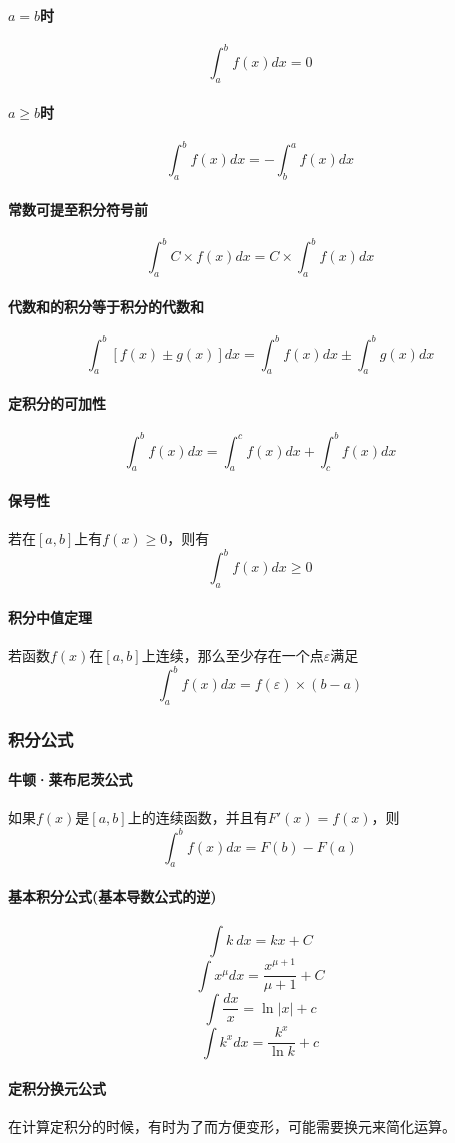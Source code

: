 \documentclass[UTF-8]{ctexart}
\begin{document}
	\paragraph{$a=b$时} $$\int _ a^b f(x)dx=0$$
	\paragraph{$a \ge b$时} $$\int _ a^b f(x)dx=-\int _ b^a f(x)dx$$
	\paragraph{常数可提至积分符号前}$$\int _ a^b C \times f(x)dx=C \times \int _ a^b f(x)dx$$
	\paragraph{代数和的积分等于积分的代数和}$$\int _ a^b [f(x)\pm g(x)]dx=\int _ a^b f(x)dx\pm\int _ a^b g(x)dx$$
	\paragraph{定积分的可加性}
	$$\int _ a^b f(x)dx=\int _ a^c f(x)dx+\int _ c^b f(x)dx$$
	\paragraph{保号性}
	若在$[a,b]$上有$f(x) \ge 0$，则有$$\int _ a^b f(x)dx \ge 0$$
	\paragraph{积分中值定理}若函数$f(x)$在$[a,b]$上连续，那么至少存在一个点$\varepsilon$满足$$\int _ a^b f(x)dx=f(\varepsilon) \times (b-a)$$
	\subsubsection{积分公式}
	\paragraph{牛顿·莱布尼茨公式}如果$f(x)$是$[a,b]$上的连续函数，并且有$F'(x)=f(x)$，则$$\int _ a^b f(x)dx=F(b)-F(a)$$
	\paragraph{基本积分公式(基本导数公式的逆)}
	$$\int k\ dx=kx+C$$
	$$\int x^\mu dx=\frac{x^{\mu+1}}{\mu+1}+C$$
	$$\int \frac{dx}{x}=\ln |x|+c$$
	$$\int k^x dx=\frac{k^x}{\ln k}+c$$
	\paragraph{定积分换元公式}	在计算定积分的时候，有时为了而方便变形，可能需要换元来简化运算。  
	
\end{document}
